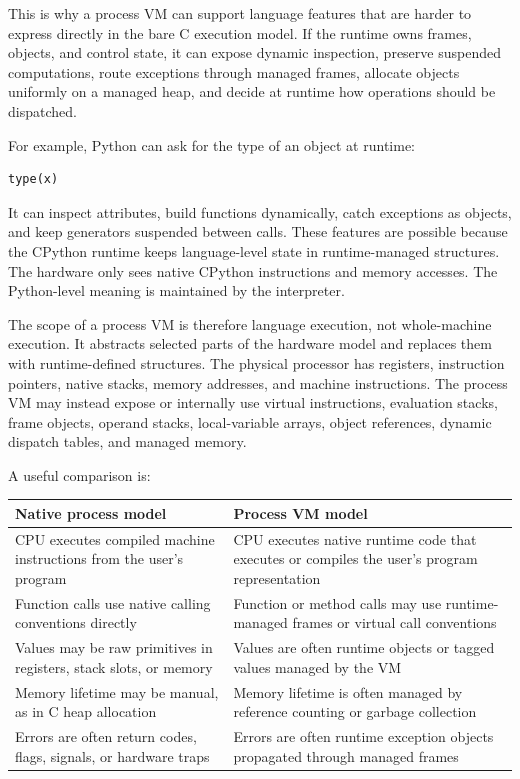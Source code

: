 This is why a process VM can support language features that are harder to express directly in the bare C execution model. If the runtime owns frames, objects, and control state, it can expose dynamic inspection, preserve suspended computations, route exceptions through managed frames, allocate objects uniformly on a managed heap, and decide at runtime how operations should be dispatched.

For example, Python can ask for the type of an object at runtime:

\begin{verbatim}
type(x)
\end{verbatim}

It can inspect attributes, build functions dynamically, catch exceptions as objects, and keep generators suspended between calls. These features are possible because the CPython runtime keeps language-level state in runtime-managed structures. The hardware only sees native CPython instructions and memory accesses. The Python-level meaning is maintained by the interpreter.

The scope of a process VM is therefore language execution, not whole-machine execution. It abstracts selected parts of the hardware model and replaces them with runtime-defined structures. The physical processor has registers, instruction pointers, native stacks, memory addresses, and machine instructions. The process VM may instead expose or internally use virtual instructions, evaluation stacks, frame objects, operand stacks, local-variable arrays, object references, dynamic dispatch tables, and managed memory.

A useful comparison is:

\begin{center}
\begin{tabular}{|p{}|p{}|}
\hline
\textbf{Native process model} & \textbf{Process VM model} \\
\hline
CPU executes compiled machine instructions from the user's program & CPU executes native runtime code that executes or compiles the user's program representation \\
\hline
Function calls use native calling conventions directly & Function or method calls may use runtime-managed frames or virtual call conventions \\
\hline
Values may be raw primitives in registers, stack slots, or memory & Values are often runtime objects or tagged values managed by the VM \\
\hline
Memory lifetime may be manual, as in C heap allocation & Memory lifetime is often managed by reference counting or garbage collection \\
\hline
Errors are often return codes, flags, signals, or hardware traps & Errors are often runtime exception objects propagated through managed frames \\
\hline
\end{tabular}
\end{center}

